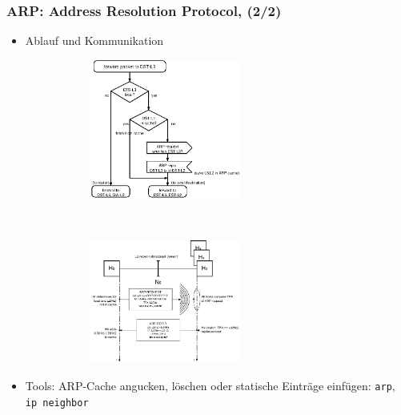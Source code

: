 \documentclass{beamer}
\begin{document}
\begin{frame}
\frametitle{ARP: Address Resolution Protocol, (2/2)}
\begin{itemize}
  \item{Ablauf und Kommunikation} \vspace{0.25cm}
  \begin{figure}{}
     \begin{subfigure}{}
        \includegraphics[width=5cm]{arp-procedure.eps}
     \end{subfigure}
     ~
     \begin{subfigure}{}
        \includegraphics[width=5cm]{arp-communication}
     \end{subfigure}
  \end{figure}
  \item{Tools: ARP-Cache angucken, l\"oschen oder statische Eintr\"age einf\"ugen: \texttt{arp}, \texttt{ip neighbor}}
\end{itemize}
\end{frame}
\end{document}
